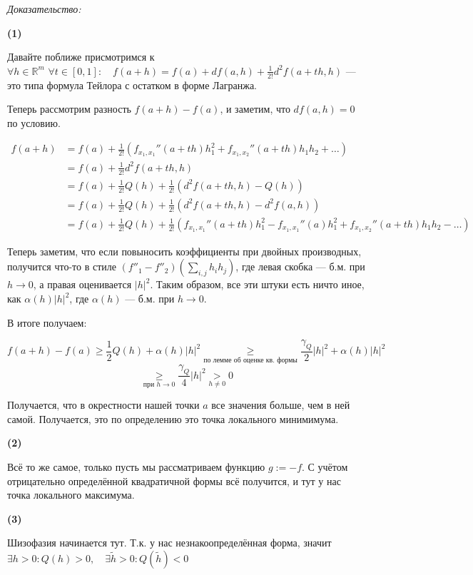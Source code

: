 \documentclass{article}
\def\dbl{\,\,}
\begin{document}
\textit{Доказательство:}

\textbf{(1)}

Давайте поближе присмотримся к $\forall h \in \mathbb{R}^m \dbl \forall t \in [0, 1]: \quad f(a + h) = f(a) + df(a, h) + \frac{1}{2!}d^2f(a + th, h)$ --- это типа формула Тейлора с остатком в форме Лагранжа.

Теперь рассмотрим разность $f(a + h) - f(a)$, и заметим, что $df(a, h) = 0$ по условию.

\begin{align*}
    f(a + h) &= f(a) + \frac{1}{2!}(f_{x_1, x_1}''(a+th)h_1^2 + f_{x_1, x_2}''(a + th)h_1h_2 + \ldots) \\
    &= f(a) + \frac{1}{2!}d^2f(a + th, h) \\
    &= f(a) + \frac{1}{2!}Q(h) + \frac{1}{2!}(d^2f(a + th, h) - Q(h))\\
    &= f(a) + \frac{1}{2!}Q(h) + \frac{1}{2!}(d^2f(a + th, h) - d^2f(a, h))\\
    &= f(a) + \frac{1}{2!}Q(h) + \frac{1}{2!}(f_{x_1, x_1}''(a+th)h_1^2 - f_{x_1, x_1}''(a)h_1^2 + f_{x_1, x_2}''(a + th)h_1h_2 - \ldots)
\end{align*}

Теперь заметим, что если повыносить коэффициенты при двойных производных, получится что-то в стиле $(f''_1 - f''_2)(\sum_{i, j}{h_i h_j})$, где левая скобка --- б.м. при $h \rightarrow 0$, а правая оценивается $|h|^2$. Таким образом, все эти штуки есть ничто иное, как $\alpha(h)|h|^2$, где $\alpha(h)$ --- б.м. при $h \rightarrow 0$.

В итоге получаем:

\[f(a + h) - f(a) \ge \frac{1}{2}Q(h) + \alpha(h)|h|^2 \underset{\text{по лемме об оценке кв. формы}}{\ge} \frac{\gamma_Q}{2}|h|^2 + \alpha(h)|h|^2\]
\[\underset{\text{при } h \rightarrow 0 }{\ge} \frac{\gamma_Q}{4}|h|^2 \underset{h \neq 0}{>} 0\]

Получается, что в окрестности нашей точки $a$ все значения больше, чем в ней самой. Получается, это по определению это точка локального минимимума.

\textbf{(2)}

Всё то же самое, только пусть мы рассматриваем функцию $g := -f$. С учётом отрицательно определённой квадратичной формы всё получится, и тут у нас точка локального максимума.

\textbf{(3)}

Шизофазия начинается тут. Т.к. у нас незнакоопределённая форма, значит $\exists h > 0: Q(h) > 0, \quad \exists \widetilde{h} > 0: Q(\widetilde{h}) < 0$
\end{document}

